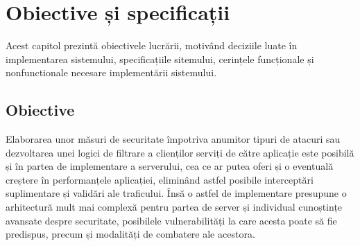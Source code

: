 
 \chapter{Obiective și specificații}
\label{cap:obiective-specificatii}

%

Acest capitol prezintă obiectivele lucrării, motivând deciziile luate în implementarea sistemului, specificațiile sitemului, cerințele funcționale și nonfunctionale necesare implementării sistemului. 

 \section{Obiective}
%
Elaborarea unor măsuri de securitate împotriva anumitor tipuri de atacuri sau dezvoltarea unei logici de filtrare a clienților serviți de către aplicație este posibilă și în partea de implementare a serverului, cea ce ar putea oferi și o eventuală creștere în performanțele aplicației, eliminând astfel posibile interceptări suplimentare și validări ale traficului. Însă o astfel de implementare presupune o arhitectură mult mai complexă pentru partea de server și individual cunoștințe avansate despre securitate, posibilele vulnerabilități la care acesta poate să fie predispus, precum și modalități de combatere ale acestora.  
  
